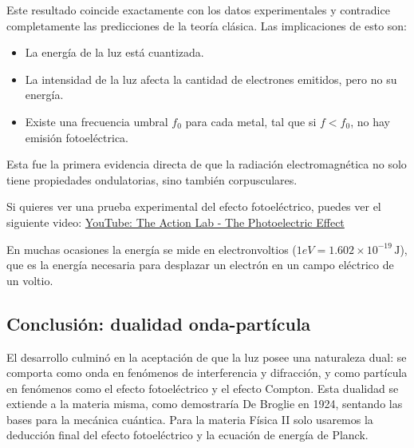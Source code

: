 Este resultado coincide exactamente con los datos experimentales y contradice completamente las predicciones de la teoría clásica. Las implicaciones de esto son:

\begin{itemize}
  \item La energía de la luz está cuantizada.
  \item La intensidad de la luz afecta la cantidad de electrones emitidos, pero no su energía.
  \item Existe una frecuencia umbral \(f_0\) para cada metal, tal que si \(f < f_0\), no hay emisión fotoeléctrica.
\end{itemize}

Esta fue la primera evidencia directa de que la radiación electromagnética no solo tiene propiedades ondulatorias, sino también corpusculares.

Si quieres ver una prueba experimental del efecto fotoeléctrico, puedes ver el siguiente video: \href{https://youtu.be/oYnp0WZDhYQ?si=kIBH75DIIDv5hg_4}{YouTube: The Action Lab - The Photoelectric Effect}

\begin{tcolorbox}[myconclusion]
  En muchas ocasiones la energía se mide en electronvoltios (\(1 eV = 1.602 \times 10^{-19} \, \text{J}\)), que es la energía necesaria para desplazar un electrón en un campo eléctrico de un voltio.
\end{tcolorbox}

\subsection{Conclusión: dualidad onda-partícula}

El desarrollo culminó en la aceptación de que la luz posee una naturaleza dual: se comporta como onda en fenómenos de interferencia y difracción, y como partícula en fenómenos como el efecto fotoeléctrico y el efecto Compton. Esta dualidad se extiende a la materia misma, como demostraría De Broglie en 1924, sentando las bases para la mecánica cuántica. Para la materia Física II solo usaremos la deducción final del efecto fotoeléctrico y la ecuación de energía de Planck.
